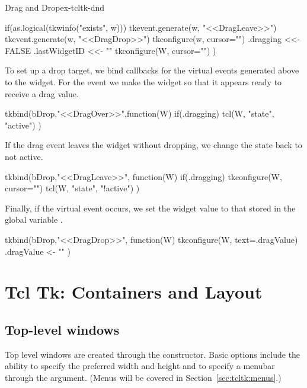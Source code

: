 \begin{example}{Drag and Drop}{ex-tcltk-dnd}
\begin{Schunk}
\begin{Sinput}
{   if(as.logical(tkwinfo("exists", w))) {
     tkevent.generate(w, "<<DragLeave>>")
     tkevent.generate(w, "<<DragDrop>>")
     tkconfigure(w, cursor="")
   }
   .dragging <<- FALSE
   .lastWidgetID <<- "" 
   tkconfigure(W, cursor="")
 })
\end{Sinput}
\end{Schunk}
%
%
To set up a drop target, we bind callbacks for the virtual events
generated above to the widget. For the  event
we make the widget  so that it appears ready to receive a
drag value.
\begin{Schunk}
\begin{Sinput}
 tkbind(bDrop,"<<DragOver>>",function(W) {
   if(.dragging) 
     tcl(W, "state", "active")
 })
\end{Sinput}
\end{Schunk}
%
If the drag event leaves the widget without dropping, we change the
state back to not active.
\begin{Schunk}
\begin{Sinput}
 tkbind(bDrop,"<<DragLeave>>", function(W) {
   if(.dragging)  {
     tkconfigure(W, cursor="")
     tcl(W, "state", "!active")  
    }
 })
\end{Sinput}
\end{Schunk}
%
Finally, if the  virtual event occurs, we set
the widget value to that stored in the global variable
.
\begin{Schunk}
\begin{Sinput}
 tkbind(bDrop,"<<DragDrop>>", function(W) {
   tkconfigure(W, text=.dragValue)
   .dragValue <- ""
 })
\end{Sinput}
\end{Schunk}
\end{example}





\chapter{Tcl Tk: Containers and Layout}
\label{sec:tcltk:basic-containers}

\section{Top-level windows}
\label{sec:tcltk:top-level-windows}

Top level windows are created through the 
constructor. Basic options include the ability to specify the
preferred width and height and to specify a menubar through
the  argument. (Menus will be covered in
Section~\ref{sec:tcltk:menus}.)


